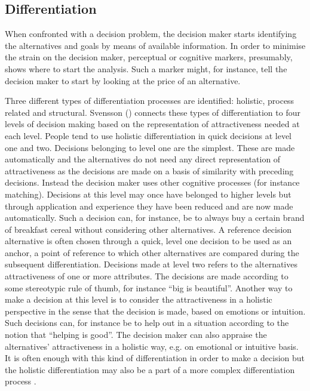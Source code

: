 \documentclass[jou,draftfirst,11pt]{apa6}
\begin{document}
\subsection{Differentiation}

When confronted with a decision problem, the decision maker starts
identifying the alternatives and goals by means of available
information.  In order to minimise the strain on the decision maker,
perceptual or cognitive markers, presumably, shows where to start the
analysis.  Such a marker might, for instance, tell the decision maker
to start by looking at the price of an alternative.

Three different types of differentiation processes are identified:
holistic, process related and structural.  Svensson
(\citeyear{svensson92b}) connects these types of differentiation to
four levels of decision making based on the representation of
attractiveness needed at each level.  People tend to use holistic
differentiation in quick decisions at level one and two.   Decisions
belonging to level one are the simplest.  These are made automatically
and the alternatives do not need any direct representation of
attractiveness as the decisions are made on a basis of similarity with
preceding decisions.  Instead the decision maker uses other cognitive
processes (for instance matching).  Decisions at this level may once
have belonged to higher levels but through application and experience
they have been reduced and are now made automatically.  Such a
decision can, for instance, be to always buy a certain brand of
breakfast cereal without considering other alternatives.  A reference
decision alternative is often chosen through a quick, level one
decision to be used as an anchor, a point of reference to which other
alternatives are compared during the subsequent differentiation.
Decisions made at level two refers to the alternatives attractiveness
of one or more attributes.  The decisions are made according to some
stereotypic rule of thumb, for instance ``big is beautiful''.  Another
way to make a decision at this level is to consider the attractiveness
in a holistic perspective in the sense that the decision is made,
based on emotions or intuition.  Such decisions can, for instance be
to help out in a situation according to the notion that ``helping is
good''.  The decision maker can also appraise the alternatives'
attractiveness in a holistic way, e.g. on emotional or intuitive
basis.  It is often enough with this kind of differentiation in order
to make a decision but the holistic differentiation may also be a part
of a more complex differentiation process \parencite{svensson92b,
  Svensson96}.
\end{document}
